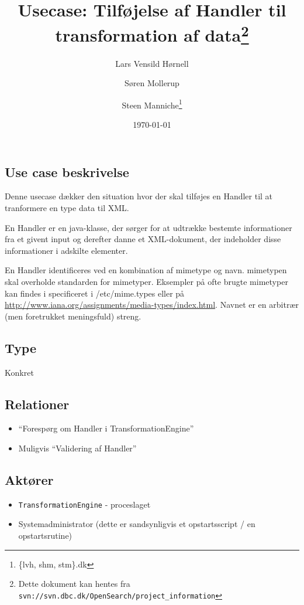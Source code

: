 \documentclass{article}
\author{Lars Vensild Hørnell \and Søren Mollerup \and Steen
  Manniche\thanks{\{lvh, shm, stm\}\@dbc.dk}}
\date{\today}
\title{Usecase: Tilføjelse af Handler til transformation af data\thanks{Dette dokument kan hentes fra \texttt{svn://svn.dbc.dk/OpenSearch/project\_information}}}
\begin{document}
\maketitle

\newpage

\tableofcontents

\section{ }


\subsection{Use case beskrivelse}
Denne usecase dækker den situation hvor der skal tilføjes en Handler
til at tranformere en type data til XML. 

En Handler er en java-klasse, der sørger for at udtrække bestemte
informationer fra et givent input og derefter danne et XML-dokument,
der indeholder disse informationer i adskilte elementer.

En Handler identificeres ved en kombination af mimetype og
navn. mimetypen skal overholde standarden for mimetyper. Eksempler på
ofte brugte mimetyper kan findes i specificeret i /etc/mime.types
eller på
\url{http://www.iana.org/assignments/media-types/index.html}. Navnet
er en arbitrær (men foretrukket meningsfuld) streng.

\subsection{Type}
Konkret

\subsection{Relationer}
\begin{itemize}
\item ``Forespørg om Handler i TransformationEngine''
\item Muligvis ``Validering af Handler''
\end{itemize}



\subsection{Aktører}
\begin{itemize}
\item \texttt{TransformationEngine} - proceslaget
\item Systemadministrator (dette er sandsynligvis et opstartsscript / en opstartsrutine)
\end{itemize}
\end{document}
